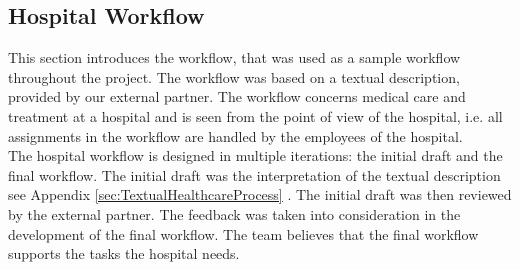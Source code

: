 \subsection{Hospital Workflow}
This section introduces the workflow, that was used as a sample workflow throughout the project. The workflow was based on a textual description, provided by our external partner. The workflow concerns medical care and treatment at a hospital and is seen from the point of view of the hospital, i.e. all assignments in the workflow are handled by the employees of the hospital. \\

The hospital workflow is designed in multiple iterations: the initial draft and the final workflow. The initial draft was the interpretation of the textual description see Appendix \ref{sec:TextualHealthcareProcess} . The initial draft was then reviewed by the external partner. The feedback was taken into consideration in the development of the final workflow. \newline
The team believes that the final workflow supports the tasks the hospital needs. 